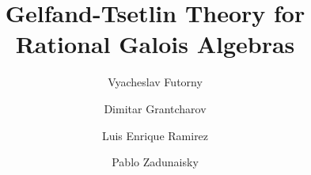 \documentclass[11pt,fleqn]{article}
\begin{document}
\title{Gelfand-Tsetlin Theory for Rational Galois Algebras}
\date{}



\author[V.Futorny]{Vyacheslav Futorny}
\address{Instituto de Matem\'atica e Estat\'istica, Universidade de S\~ao
Paulo,  S\~ao Paulo SP, Brasil} 
\author[D.Gratcharov]{Dimitar Grantcharov}
\address{\noindent
University of Texas at Arlington,  Arlington, TX 76019, USA} 
\author[L.E.Ramirez]{Luis Enrique Ramirez}
\address{Universidade Federal do ABC,  Santo Andr\'e-SP, Brasil} 
\author[P.Zadunaisky]{Pablo Zadunaisky}
\address{Instituto de Matem\'atica e Estat\'istica, Universidade de S\~ao
Paulo,  S\~ao Paulo SP, Brasil} 
\end{document}
